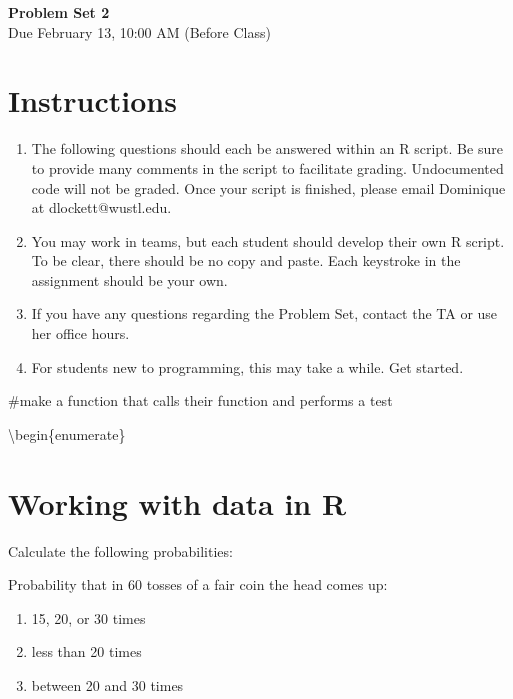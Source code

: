 \documentclass[
]{article}
\author{}
\date{\vspace{-2.5em}}
\begin{document}
\begin{center}
{\Large{\textbf{Problem Set 2}}} \\
\vspace{4 bp}
Due February 13, 10:00 AM (Before Class) \\
\end{center}

\section*{Instructions}
\begin{enumerate}
\item The following questions should each be answered within an R script. Be sure to provide many comments in the script to facilitate grading. Undocumented code will not be graded. Once your script is finished, please email Dominique at dlockett@wustl.edu.
\item You may work in teams, but each student should develop their own R script. To be clear, there should be no copy and paste. Each keystroke in the assignment should be your own.
\item If you have any questions regarding the Problem Set, contact the TA or use her office hours.
\item For students new to programming, this may take a while. Get started.
\end{enumerate}

\#make a function that calls their function and performs a test

\textbackslash begin\{enumerate\}

\section*{Working with data in R}

\vspace{1cm}
\item

Calculate the following probabilities:

\item

Probability that in 60 tosses of a fair coin the head comes up:

\begin{enumerate}
\item 15, 20, or 30 times
\item less than 20 times
\item between 20 and 30 times
\end{enumerate}
\end{document}
